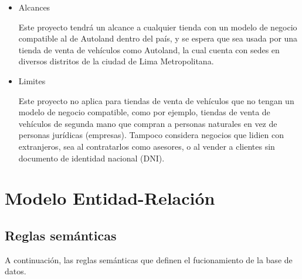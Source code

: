 \documentclass[12pt]{article}
\begin{document}
\begin{itemize}

\item Alcances

Este proyecto tendrá un alcance a cualquier tienda con un modelo de negocio compatible al de Autoland dentro del país, y se espera que sea usada por una tienda de venta de vehículos como Autoland, la cual cuenta con sedes en diversos distritos de la ciudad de Lima Metropolitana.

\item Limites

Este proyecto no aplica para tiendas de venta de vehículos que no tengan un modelo de negocio compatible, como por ejemplo, tiendas de venta de vehículos de segunda mano que compran a personas naturales en vez de personas jurídicas (empresas). Tampoco considera negocios que lidien con extranjeros, sea al contratarlos como asesores, o al vender a clientes sin documento de identidad nacional (DNI).


\end{itemize}


\section{Modelo Entidad-Relaci\'on}

\subsection{Reglas sem\'anticas}

A continuación, las reglas semánticas que definen el fucionamiento de la base de datos.
\end{document}

